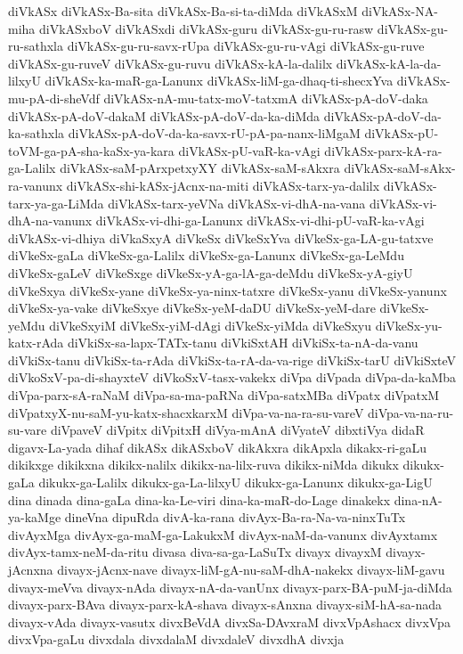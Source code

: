 {diVkASx
diVkASx-Ba-sita
diVkASx-Ba-si-ta-diMda
diVkASxM
diVkASx-NA-miha
diVkASxboV
diVkASxdi
diVkASx-guru
diVkASx-gu-ru-rasw
diVkASx-gu-ru-sathxla
diVkASx-gu-ru-savx-rUpa
diVkASx-gu-ru-vAgi
diVkASx-gu-ruve
diVkASx-gu-ruveV
diVkASx-gu-ruvu
diVkASx-kA-la-dalilx
diVkASx-kA-la-da-lilxyU
diVkASx-ka-maR-ga-Lanunx
diVkASx-liM-ga-dhaq-ti-shecxYva
diVkASx-mu-pA-di-sheVdf
diVkASx-nA-mu-tatx-moV-tatxmA
diVkASx-pA-doV-daka
diVkASx-pA-doV-dakaM
diVkASx-pA-doV-da-ka-diMda
diVkASx-pA-doV-da-ka-sathxla
diVkASx-pA-doV-da-ka-savx-rU-pA-pa-nanx-liMgaM
diVkASx-pU-toVM-ga-pA-sha-kaSx-ya-kara
diVkASx-pU-vaR-ka-vAgi
diVkASx-parx-kA-ra-ga-Lalilx
diVkASx-saM-pArxpetxyXY
diVkASx-saM-sAkxra
diVkASx-saM-sAkx-ra-vanunx
diVkASx-shi-kASx-jAcnx-na-miti
diVkASx-tarx-ya-dalilx
diVkASx-tarx-ya-ga-LiMda
diVkASx-tarx-yeVNa
diVkASx-vi-dhA-na-vana
diVkASx-vi-dhA-na-vanunx
diVkASx-vi-dhi-ga-Lanunx
diVkASx-vi-dhi-pU-vaR-ka-vAgi
diVkASx-vi-dhiya
diVkaSxyA
diVkeSx
diVkeSxYva
diVkeSx-ga-LA-gu-tatxve
diVkeSx-gaLa
diVkeSx-ga-Lalilx
diVkeSx-ga-Lanunx
diVkeSx-ga-LeMdu
diVkeSx-gaLeV
diVkeSxge
diVkeSx-yA-ga-lA-ga-deMdu
diVkeSx-yA-giyU
diVkeSxya
diVkeSx-yane
diVkeSx-ya-ninx-tatxre
diVkeSx-yanu
diVkeSx-yanunx
diVkeSx-ya-vake
diVkeSxye
diVkeSx-yeM-daDU
diVkeSx-yeM-dare
diVkeSx-yeMdu
diVkeSxyiM
diVkeSx-yiM-dAgi
diVkeSx-yiMda
diVkeSxyu
diVkeSx-yu-katx-rAda
diVkiSx-sa-lapx-TATx-tanu
diVkiSxtAH
diVkiSx-ta-nA-da-vanu
diVkiSx-tanu
diVkiSx-ta-rAda
diVkiSx-ta-rA-da-va-rige
diVkiSx-tarU
diVkiSxteV
diVkoSxV-pa-di-shayxteV
diVkoSxV-tasx-vakekx
diVpa
diVpada
diVpa-da-kaMba
diVpa-parx-sA-raNaM
diVpa-sa-ma-paRNa
diVpa-satxMBa
diVpatx
diVpatxM
diVpatxyX-nu-saM-yu-katx-shacxkarxM
diVpa-va-na-ra-su-vareV
diVpa-va-na-ru-su-vare
diVpaveV
diVpitx
diVpitxH
diVya-mAnA
diVyateV
dibxtiVya
didaR
digavx-La-yada
dihaf
dikASx
dikASxboV
dikAkxra
dikApxla
dikakx-ri-gaLu
dikikxge
dikikxna
dikikx-nalilx
dikikx-na-lilx-ruva
dikikx-niMda
dikukx
dikukx-gaLa
dikukx-ga-Lalilx
dikukx-ga-La-lilxyU
dikukx-ga-Lanunx
dikukx-ga-LigU
dina
dinada
dina-gaLa
dina-ka-Le-viri
dina-ka-maR-do-Lage
dinakekx
dina-nA-ya-kaMge
dineVna
dipuRda
divA-ka-rana
divAyx-Ba-ra-Na-va-ninxTuTx
divAyxMga
divAyx-ga-maM-ga-LakukxM
divAyx-naM-da-vanunx
divAyxtamx
divAyx-tamx-neM-da-ritu
divasa
diva-sa-ga-LaSuTx
divayx
divayxM
divayx-jAcnxna
divayx-jAcnx-nave
divayx-liM-gA-nu-saM-dhA-nakekx
divayx-liM-gavu
divayx-meVva
divayx-nAda
divayx-nA-da-vanUnx
divayx-parx-BA-puM-ja-diMda
divayx-parx-BAva
divayx-parx-kA-shava
divayx-sAnxna
divayx-siM-hA-sa-nada
divayx-vAda
divayx-vasutx
divxBeVdA
divxSa-DAvxraM
divxVpAshacx
divxVpa
divxVpa-gaLu
divxdala
divxdalaM
divxdaleV
divxdhA
divxja
}
